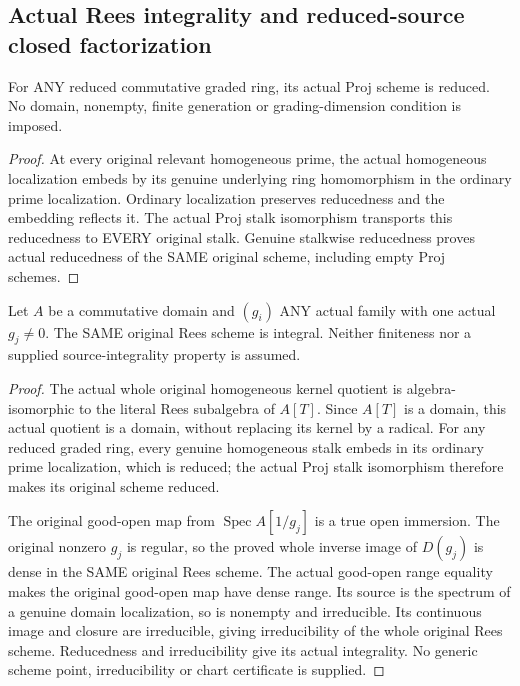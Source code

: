 \subsection{Actual Rees integrality and reduced-source closed factorization}

\begin{lemma}
\label{scheme:actual-reduced-graded-proj}
\leanok
For ANY reduced commutative graded ring, its actual Proj scheme is reduced.
No domain, nonempty, finite generation or grading-dimension condition is imposed.
\end{lemma}
\begin{proof}
At every original relevant homogeneous prime, the actual homogeneous localization
embeds by its genuine underlying ring homomorphism in the ordinary prime
localization. Ordinary localization preserves reducedness and the embedding
reflects it. The actual Proj stalk isomorphism transports this reducedness to
EVERY original stalk. Genuine stalkwise reducedness proves actual reducedness
of the SAME original scheme, including empty Proj schemes.
\end{proof}

\begin{lemma}
\label{scheme:actual-original-rees-integral}
\leanok
{}
Let $A$ be a commutative domain and $(g_i)$ ANY actual family with one
actual $g_j\ne0$. The SAME original Rees scheme is integral. Neither
finiteness nor a supplied source-integrality property is assumed.
\end{lemma}
\begin{proof}
The actual whole original homogeneous kernel quotient is algebra-isomorphic
to the literal Rees subalgebra of $A[T]$. Since $A[T]$ is a domain, this
actual quotient is a domain, without replacing its kernel by a radical.
For any reduced graded ring, every genuine homogeneous stalk embeds in
its ordinary prime localization, which is reduced; the actual Proj stalk
isomorphism therefore makes its original scheme reduced.

The original good-open map from $\operatorname{Spec}A[1/g_j]$ is a true
open immersion. The original nonzero $g_j$ is regular, so the proved
whole inverse image of $D(g_j)$ is dense in the SAME original Rees scheme.
The actual good-open range equality makes the original good-open map have
dense range. Its source is the spectrum of a genuine domain localization,
so is nonempty and irreducible. Its continuous image and closure are
irreducible, giving irreducibility of the whole original Rees scheme.
Reducedness and irreducibility give its actual integrality. No generic
scheme point, irreducibility or chart certificate is supplied.
\end{proof}

